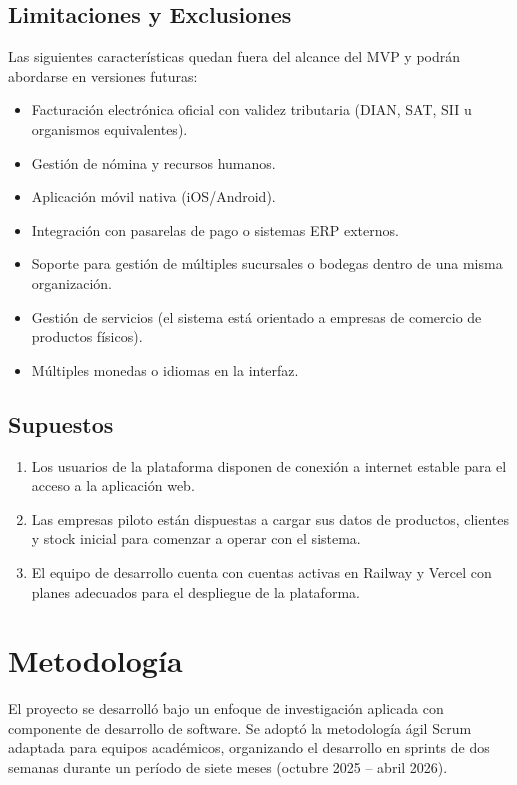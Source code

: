 \subsection{Limitaciones y Exclusiones}\label{limitaciones-y-exclusiones}

Las siguientes características quedan fuera del alcance del MVP y podrán abordarse en versiones futuras:

\begin{itemize}
\tightlist
\item
  Facturación electrónica oficial con validez tributaria (DIAN, SAT, SII u organismos equivalentes).
\item
  Gestión de nómina y recursos humanos.
\item
  Aplicación móvil nativa (iOS/Android).
\item
  Integración con pasarelas de pago o sistemas ERP externos.
\item
  Soporte para gestión de múltiples sucursales o bodegas dentro de una misma organización.
\item
  Gestión de servicios (el sistema está orientado a empresas de comercio de productos físicos).
\item
  Múltiples monedas o idiomas en la interfaz.
\end{itemize}

\subsection{Supuestos}\label{supuestos}

\begin{enumerate}
\def\labelenumi{\arabic{enumi}.}
\tightlist
\item
  Los usuarios de la plataforma disponen de conexión a internet estable para el acceso a la aplicación web.
\item
  Las empresas piloto están dispuestas a cargar sus datos de productos, clientes y stock inicial para comenzar a operar con el sistema.
\item
  El equipo de desarrollo cuenta con cuentas activas en Railway y Vercel con planes adecuados para el despliegue de la plataforma.
\end{enumerate}

\section{Metodología}\label{metodologuxeda}

El proyecto se desarrolló bajo un enfoque de investigación aplicada con componente de desarrollo de software. Se adoptó la metodología ágil Scrum adaptada para equipos académicos, organizando el desarrollo en sprints de dos semanas durante un período de siete meses (octubre 2025 -- abril 2026).

